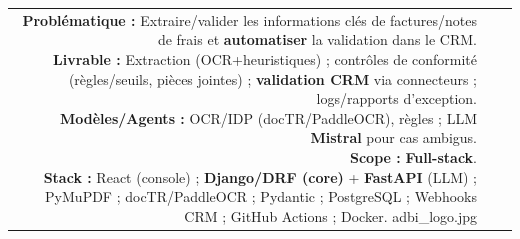 \documentclass{modernsimplecv}
\newlength{\rightcolwidth}
\begin{document}
\begin{paracol}{2}
\begin{minipage}[t]{\rightcolwidth}
\begin{tabular}{r| p{} c}
\cvevent{2023}{Validation automatique de notes de frais}{Tech Lead}{ADBI}{
\textbf{Problématique :} Extraire/valider les informations clés de factures/notes de frais et \textbf{automatiser} la validation dans le CRM.\newline
\textbf{Livrable :} Extraction (OCR+heuristiques) ; contrôles de conformité (règles/seuils, pièces jointes) ; \textbf{validation CRM} via connecteurs ; logs/rapports d’exception.\newline
\textbf{Modèles/Agents :} OCR/IDP (docTR/PaddleOCR), règles ; LLM \textbf{Mistral} pour cas ambigus.\newline
\textbf{Scope :} \textbf{Full-stack}.\newline
\textbf{Stack :} React (console) ; \textbf{Django/DRF (core)} + \textbf{FastAPI} (LLM) ; PyMuPDF ; docTR/PaddleOCR ; Pydantic ; PostgreSQL ; Webhooks CRM ; GitHub Actions ; Docker.
}{adbi_logo.jpg} \\

\end{tabular}
\end{minipage}

\end{paracol}

\vfill{} %

\end{document}

